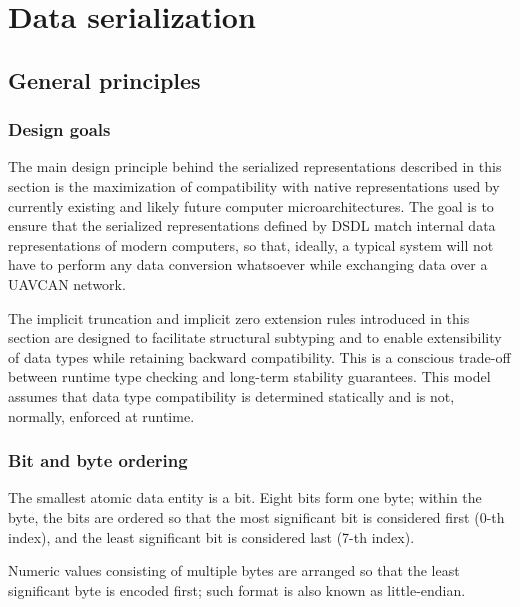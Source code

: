 \section{Data serialization}\label{sec:dsdl_data_serialization}

\newcommand{\hugett}[1]{\texttt{\huge{#1}}}

\subsection{General principles}

\subsubsection{Design goals}

The main design principle behind the serialized representations described in this section is
the maximization of compatibility with native representations used by currently existing and
likely future computer microarchitectures.
The goal is to ensure that the serialized representations defined by DSDL match internal data representations of
modern computers, so that, ideally, a typical system will not have to perform any data conversion whatsoever while
exchanging data over a UAVCAN network.

The implicit truncation and implicit zero extension rules introduced in this section are designed to
facilitate structural subtyping and to enable extensibility of data types while retaining backward compatibility.
This is a conscious trade-off between runtime type checking and long-term stability guarantees.
This model assumes that data type compatibility is determined statically and is not, normally, enforced at runtime.

\subsubsection{Bit and byte ordering}

The smallest atomic data entity is a bit.
Eight bits form one byte;
within the byte, the bits are ordered so that the most significant bit is considered first (0-th index),
and the least significant bit is considered last (7-th index).

Numeric values consisting of multiple bytes are arranged so that the least significant byte is encoded first;
such format is also known as little-endian.

